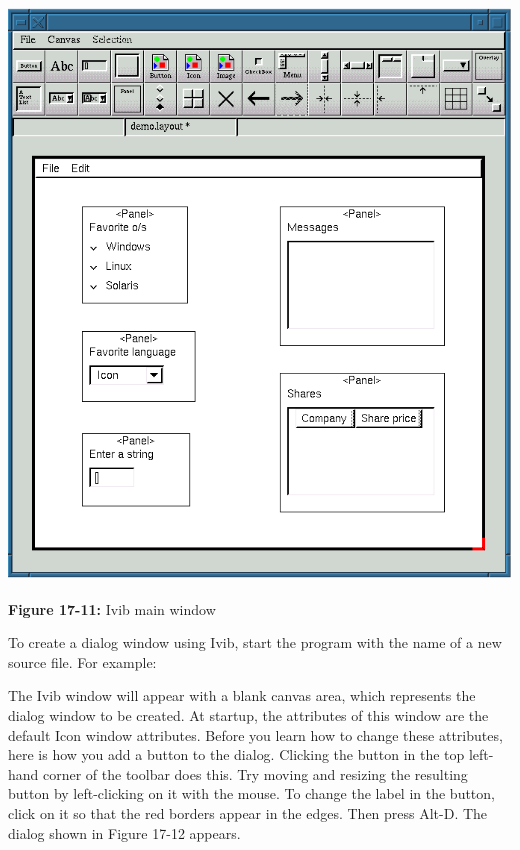 \begin{center}
\includegraphics[width=5.2957in,height=6.0in]{ub-img/ub-img60.png}
\end{center}

{\sffamily\bfseries Figure 17-11:}
{\sffamily Ivib main window}

To create a dialog window using Ivib, start the program with the name of
a new source file. For example:


The Ivib window will appear with a blank
{\textquotedbl}canvas{\textquotedbl} area, which represents the dialog
window to be created. At startup, the attributes of this window are the
default Icon window attributes. Before you learn how to change these
attributes, here is how you add a button to the dialog. Clicking the
button in the top left-hand corner of the toolbar does this. Try moving
and resizing the resulting button by left-clicking on it with the
mouse. To change the label in the button, click on it so that the red
borders appear in the edges. Then press Alt-D. The dialog shown in
Figure 17-12 appears.

